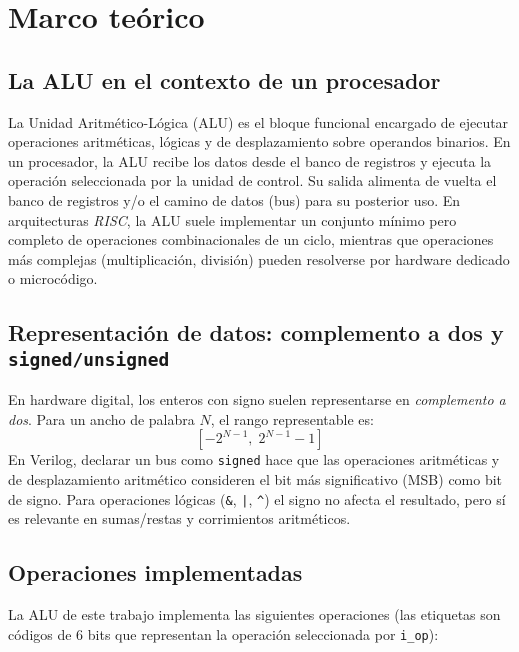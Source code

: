 \section{Marco teórico}

\subsection{La ALU en el contexto de un procesador}
La Unidad Aritmético-Lógica (ALU) es el bloque funcional encargado de ejecutar operaciones aritméticas, lógicas y de desplazamiento sobre operandos binarios. En un procesador, la ALU recibe los datos desde el banco de registros y ejecuta la operación seleccionada por la unidad de control. Su salida alimenta de vuelta el banco de registros y/o el camino de datos (bus) para su posterior uso. 
En arquitecturas \textit{RISC}, la ALU suele implementar un conjunto mínimo pero completo de operaciones combinacionales de un ciclo, mientras que operaciones más complejas (multiplicación, división) pueden resolverse por hardware dedicado o microcódigo.

\subsection{Representación de datos: complemento a dos y \texttt{signed/unsigned}}
En hardware digital, los enteros con signo suelen representarse en \textit{complemento a dos}. Para un ancho de palabra $N$, el rango representable es:
\[
[-2^{N-1}, \; 2^{N-1}-1]
\]
En Verilog, declarar un bus como \texttt{signed} hace que las operaciones aritméticas y de desplazamiento aritmético consideren el bit más significativo (MSB) como bit de signo. Para operaciones lógicas (\texttt{\&}, \texttt{|}, \texttt{\^{}}) el signo no afecta el resultado, pero sí es relevante en sumas/restas y corrimientos aritméticos.

\subsection{Operaciones implementadas}
La ALU de este trabajo implementa las siguientes operaciones (las etiquetas son códigos de 6 bits que representan la operación seleccionada por \texttt{i\_op}):

